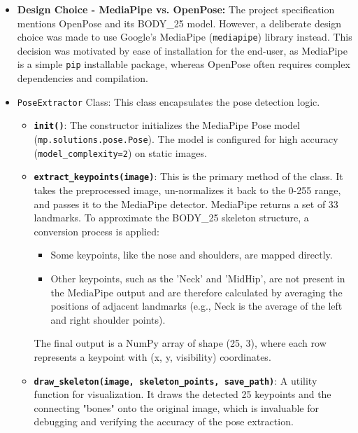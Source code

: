 \documentclass{article}
\begin{document}
\begin{itemize}
    \item \textbf{Design Choice - MediaPipe vs. OpenPose:} The project specification mentions OpenPose and its BODY_25 model. However, a deliberate design choice was made to use Google's MediaPipe (\texttt{mediapipe}) library instead. This decision was motivated by ease of installation for the end-user, as MediaPipe is a simple \texttt{pip} installable package, whereas OpenPose often requires complex dependencies and compilation.
    
    \item \texttt{PoseExtractor} Class: This class encapsulates the pose detection logic.
    \begin{itemize}
        \item \texttt{\textbf{\textunderscore\textunderscore init\textunderscore\textunderscore()}}: The constructor initializes the MediaPipe Pose model (\texttt{mp.solutions.pose.Pose}). The model is configured for high accuracy (\texttt{model_complexity=2}) on static images.
        
        \item \texttt{\textbf{extract_keypoints(image)}}: This is the primary method of the class. It takes the preprocessed image, un-normalizes it back to the 0-255 range, and passes it to the MediaPipe detector. MediaPipe returns a set of 33 landmarks. To approximate the BODY_25 skeleton structure, a conversion process is applied:
        \begin{itemize}
            \item Some keypoints, like the nose and shoulders, are mapped directly.
            \item Other keypoints, such as the 'Neck' and 'MidHip', are not present in the MediaPipe output and are therefore calculated by averaging the positions of adjacent landmarks (e.g., Neck is the average of the left and right shoulder points).
        \end{itemize}
        The final output is a NumPy array of shape (25, 3), where each row represents a keypoint with (x, y, visibility) coordinates.
        
        \item \texttt{\textbf{draw_skeleton(image, skeleton_points, save_path)}}: A utility function for visualization. It draws the detected 25 keypoints and the connecting "bones" onto the original image, which is invaluable for debugging and verifying the accuracy of the pose extraction.
    \end{itemize}
\end{itemize}
\end{document}
